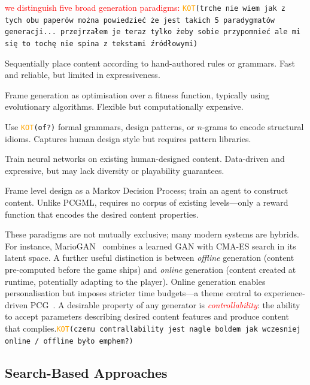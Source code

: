 \documentclass[shortabstract, mgr, english]{iithesis}
\newcommand{\DEBUG}[1]{{#1}} %
\newcommand{\KOT}[1]{\DEBUG{\tt{\textcolor{orange}{KOT}(}{#1}{)}}}
\newcommand{\changed}[1]{\textcolor{red}{#1}}
\begin{document}
\changed{we distinguish five broad generation paradigms:}
\KOT{trche nie wiem jak z tych obu paperów można powiedzieć że jest takich 5 paradygmatów generacji... przejrzałem je teraz tylko żeby sobie przypomnieć ale mi się to tochę nie spina z tekstami źródłowymi}

\begin{description}[style=nextline, leftmargin=1.5em]
    \item[Constructive / Rule-based] Sequentially place content according to
    hand-authored rules or grammars. Fast and reliable, but limited in
    expressiveness.
    \item[Search-based (SBPCG)] Frame generation as optimisation over a fitness
    function, typically using evolutionary algorithms. Flexible but
    computationally expensive.
    \item[Grammar / Pattern-based] Use \KOT{of?} formal grammars, design patterns, or
    $n$-grams to encode structural idioms. Captures human design style but
    requires pattern libraries.
    \item[Machine Learning (PCGML)] Train neural networks on existing
    human-designed content. Data-driven and expressive, but may lack diversity
    or playability guarantees.
    \item[Reinforcement Learning (PCGRL)] Frame level design as a Markov
    Decision Process; train an agent to construct content. Unlike PCGML,
    requires no corpus of existing levels---only a reward function that
    encodes the desired content properties.
\end{description}

These paradigms are not mutually exclusive; many modern systems are hybrids. For
instance, MarioGAN~\citep{volz2018evolving} combines a learned GAN with CMA-ES
search in its latent space. A further useful distinction is between \emph{offline}
generation (content pre-computed before the game ships) and \emph{online}
generation (content created at runtime, potentially adapting to the player).
Online generation enables personalisation but imposes stricter time
budgets---a theme central to experience-driven
PCG~\citep{yannakakis2011experience}. A desirable property of any generator is
\changed{\emph{controllability}}: the ability to accept parameters describing desired
content features and produce content that complies.\KOT{czemu contrallability jest nagle boldem jak wczesniej online / offline było emphem?}

\subsection{Search-Based Approaches}
\label{subsec:bg-search}
\end{document}

